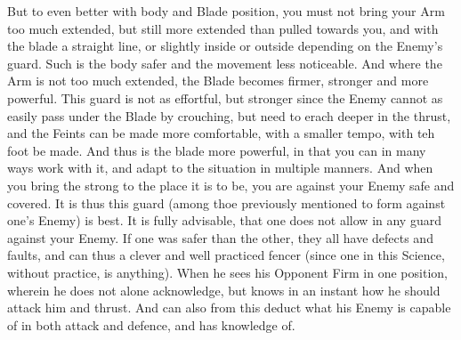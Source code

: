 But to even better with body and Blade position, you must not bring
your Arm too much extended, but still more extended than pulled
towards you, and with the blade a straight line, or slightly inside or
outside depending on the Enemy's guard. Such is the body safer and the
movement less noticeable.
And where the Arm is not too much extended, the Blade becomes firmer,
stronger and more powerful. This guard is not as effortful, but
stronger since the Enemy cannot as easily pass under the Blade by
crouching, but need to erach deeper in the thrust, and the Feints can
be made more comfortable, with a smaller tempo, with teh foot be
made. And thus is the blade more powerful, in that you can in many
ways work with it, and adapt to the situation in multiple manners.
And when you bring the strong to the place it is to be, you are
against your Enemy safe and covered. It is thus this guard (among thoe
previously mentioned to form against one's Enemy) is best. It is fully
advisable, that one does not allow in any guard against your Enemy. If
one was safer than the other, they all have defects and faults, and
can thus a clever and well practiced fencer
(since one in this Science, without practice, is anything). When he
sees his Opponent Firm in one position, wherein he does not alone
acknowledge, but knows in an instant how he should attack him and
thrust. And can also from this deduct what his Enemy is capable of in
both attack and defence, and has knowledge of.